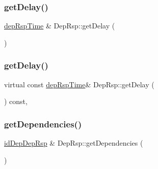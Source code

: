 \mbox{\label{class_dep_rsp_a89f0b26c269083713702386392f82c45}} 
\subsubsection{\texorpdfstring{get\+Delay()}{getDelay()}\hspace{0.1cm}{\footnotesize\ttfamily [1/2]}}
{\footnotesize\ttfamily \hyperlink{dep_rsp__m_8h_ab118b8474723cf26f98151aae3d55940}{dep\+Rsp\+Time} \& Dep\+Rsp\+::get\+Delay (\begin{DoxyParamCaption}{ }\end{DoxyParamCaption})\hspace{0.3cm}{\ttfamily [virtual]}}

\mbox{\label{class_dep_rsp_a8badf32e7f81c0ec7a9b4eb22fb83c0a}} 
\subsubsection{\texorpdfstring{get\+Delay()}{getDelay()}\hspace{0.1cm}{\footnotesize\ttfamily [2/2]}}
{\footnotesize\ttfamily virtual const \hyperlink{dep_rsp__m_8h_ab118b8474723cf26f98151aae3d55940}{dep\+Rsp\+Time}\& Dep\+Rsp\+::get\+Delay (\begin{DoxyParamCaption}{ }\end{DoxyParamCaption}) const\hspace{0.3cm}{\ttfamily [inline]}, {\ttfamily [virtual]}}

\mbox{\label{class_dep_rsp_a507c1f42135deca6079b31f5fe8da301}} 
\subsubsection{\texorpdfstring{get\+Dependencies()}{getDependencies()}\hspace{0.1cm}{\footnotesize\ttfamily [1/2]}}
{\footnotesize\ttfamily \hyperlink{dep_rsp__m_8h_a3c2ceb107008eb344443aaab2eb872b8}{id\+Dep\+Dep\+Rsp} \& Dep\+Rsp\+::get\+Dependencies (\begin{DoxyParamCaption}{ }\end{DoxyParamCaption})\hspace{0.3cm}{\ttfamily [virtual]}}

